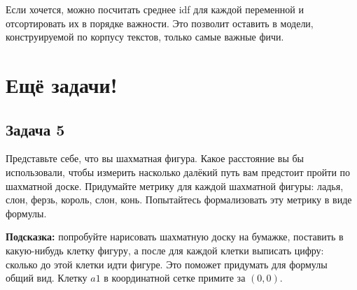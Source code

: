 \documentclass[12pt, a4paper, oneside]{article}
\begin{document}
{\begin{enumerate}
Если хочется, можно посчитать среднее idf для каждой переменной и отсортировать их в порядке важности.  Это позволит оставить в модели, конструируемой по корпусу текстов, только самые важные фичи.
\end{enumerate} 

}


\section*{Ещё задачи!}

\subsection*{Задача 5} 

Представьте себе, что вы шахматная фигура. Какое расстояние вы бы использовали, чтобы измерить насколько далёкий путь вам предстоит пройти по шахматной доске.  Придумайте метрику для каждой шахматной фигуры: ладья, слон, ферзь, король, слон, конь. Попытайтесь формализовать эту метрику в виде формулы. 

\textbf{Подсказка:}  попробуйте нарисовать шахматную доску на бумажке, поставить в какую-нибудь клетку фигуру, а после для каждой клетки выписать цифру: сколько до этой клетки идти фигуре.  Это поможет придумать для формулы общий вид. Клетку $a1$ в координатной сетке примите за $(0,0)$. 
\end{document}
